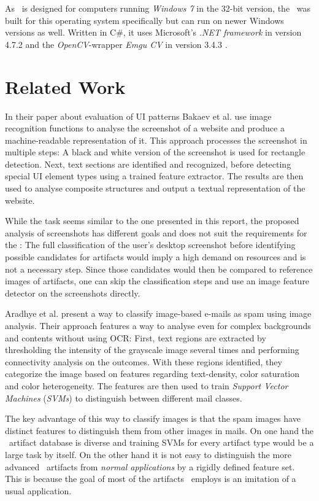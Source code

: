 As \ape~is designed for computers running \emph{Windows 7} in the 32-bit version, the \vd~was built for this operating system specifically but can run on newer Windows versions as well. Written in C\#, it uses Microsoft's \emph{.NET framework} in version 4.7.2 \cite{dotnet4_7_2} and the \emph{OpenCV}-wrapper \emph{Emgu CV} in version 3.4.3 \cite{emgucv}.

\chapter{Related Work}\label{ch:rel-work}

In their paper about evaluation of UI patterns Bakaev et al. \cite{ref_web-uis} use image recognition functions to analyse the screenshot of a website and produce a machine-readable representation of it. This approach processes the screenshot in multiple steps: A black and white version of the screenshot is used for rectangle detection. Next, text sections are identified and recognized, before detecting special UI element types using a trained feature extractor. The results are then used to analyse composite structures and output a textual representation of the website.

While the task seems similar to the one presented in this report, the proposed analysis of screenshots has different goals and does not suit the requirements for the \vd: The full classification of the user's desktop screenshot before identifying possible candidates for artifacts would imply a high demand on resources and is not a necessary step. Since those candidates would then be compared to reference images of artifacts, one can skip the classification steps and use an image feature detector on the screenshots directly.

Aradhye et al. \cite{ref_spam-mails} present a way to classify image-based e-mails as spam using image analysis. Their approach features a way to analyse even for complex backgrounds and contents without using OCR: First, text regions are extracted by thresholding the intensity of the grayscale image several times and performing connectivity analysis on the outcomes. With these regions identified, they categorize the image based on features regarding text-density, color saturation and color heterogeneity. The features are then used to train \emph{Support Vector Machines} (\emph{SVMs}) to distinguish between different mail classes.

The key advantage of this way to classify images is that the spam images have distinct features to distinguish them from other images in mails. On one hand the \ape~artifact database is diverse and training SVMs for every artifact type would be a large task by itself. On the other hand it is not easy to distinguish the more advanced \ape~artifacts from \emph{normal applications} by a rigidly defined feature set. This is because the goal of most of the artifacts \ape~employs is an imitation of a usual application.

